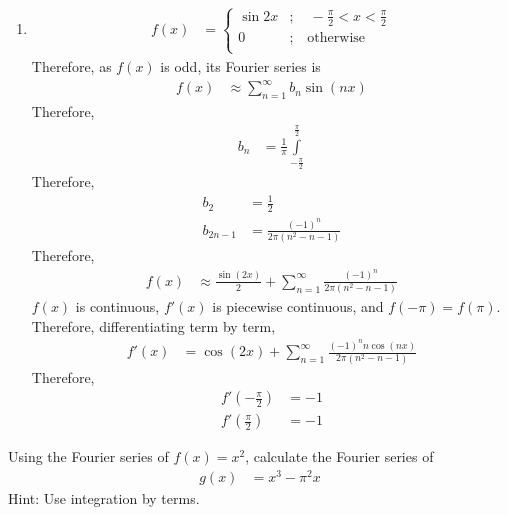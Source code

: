 \documentclass[fleqn, a4paper, 11pt, oneside]{amsart}
\theoremstyle{definition}
\theoremstyle{theorem}
\begin{document}
\begin{solution}
	\begin{enumerate}[leftmargin=*]
		\item
			\begin{align*}
				f(x) &=
					\begin{cases}
						\sin 2 x & ;\quad -\frac{\pi}{2} < x < \frac{\pi}{2} \\
						0        & ;\quad \text{otherwise}                   \\
					\end{cases}
			\end{align*}
			Therefore, as $f(x)$ is odd, its Fourier series is
			\begin{align*}
				f(x) & \approx \sum\limits_{n = 1}^{\infty} b_n \sin(n x)
			\end{align*}
			Therefore,
			\begin{align*}
				b_n & = \frac{1}{\pi} \int\limits_{-\frac{\pi}{2}}^{\frac{\pi}{2}}
			\end{align*}
			Therefore,
			\begin{align*}
				b_2         & = \frac{1}{2} \\
				b_{2 n - 1} & = \frac{(-1)^n}{2 \pi \left( n^2 - n - 1 \right)}
			\end{align*}
			Therefore,
			\begin{align*}
				f(x) & \approx \frac{\sin(2 x)}{2} + \sum\limits_{n = 1}^{\infty} \frac{(-1)^n}{2 \pi \left( n^2 - n - 1 \right)}
			\end{align*}
			$f(x)$ is continuous, $f'(x)$ is piecewise continuous, and $f(-\pi) = f(\pi)$.\\
			Therefore, differentiating term by term,
			\begin{align*}
				f'(x) &= \cos(2 x) + \sum\limits_{n = 1}^{\infty} \frac{(-1)^n n \cos(n x)}{2 \pi \left( n^2 - n - 1 \right)}
			\end{align*}
			Therefore,
			\begin{align*}
				f'\left( -\frac{\pi}{2} \right) & = -1 \\
				f'\left( \frac{\pi}{2} \right)  & = -1
			\end{align*}
	\end{enumerate}
\end{solution}

\begin{question}
	Using the Fourier series of $f(x) = x^2$, calculate the Fourier series of
	\begin{align*}
		g(x) & = x^3 - \pi^2 x
	\end{align*}
	Hint: Use integration by terms.
\end{question}
\end{document}
